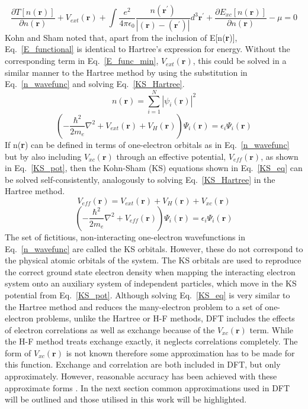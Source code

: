 \documentclass[11pt, twoside]{report}
\begin{document}
\begin{equation}\label{E_func_min}
\frac{\partial T[n(\mathbf{r})]}{\partial n(\mathbf{r})} + V_{ext}(\mathbf{r}) + \int \frac{e^2}{4\pi \epsilon_0}\frac{n(\mathbf{r^{\prime}})}{|(\mathbf{r})-(\mathbf{r^{\prime}})|}d^3\mathbf{r^{\prime}} + \frac{\partial E_{xc}[n(\mathbf{r})]}{\partial n(\mathbf{r})} - \mu = 0
\end{equation}
Kohn and Sham noted that, apart from the inclusion of E[n(\textbf{r})], Eq.~\ref{E_functional} is identical to Hartree's expression for energy. Without the corresponding term in Eq.~\ref{E_func_min}, $V_{ext}(\mathbf{r})$, this could be solved in a similar manner to the Hartree method by using the substitution in Eq.~\ref{n_wavefunc} and solving Eq.~\ref{KS_Hartree}.
\begin{equation}\label{n_wavefunc}
n(\mathbf{r}) = \sum^N_{i=1} |\psi_i(\mathbf{r})|^2
\end{equation}
\begin{equation}\label{KS_Hartree}
\left( -\frac{\hbar^2}{2m_e}\nabla^2 + V_{ext}(\mathbf{r}) + V_H(\mathbf{r}) \right) \Psi_i(\mathbf{r}) = \epsilon_i \Psi_i(\mathbf{r})  
\end{equation}
If n(\textbf{r}) can be defined in terms of one-electron orbitals as in Eq.~\ref{n_wavefunc} but by also including $V_{xc}(\mathbf{r})$ through an effective potential, $V_{eff}(\mathbf{r})$, as shown in Eq.~\ref{KS_pot}, then the Kohn-Sham (KS) equations shown in Eq.~\ref{KS_eq} can be solved self-consistently, analogously to solving Eq.~\ref{KS_Hartree} in the Hartree method.
\begin{equation}\label{KS_pot}
V_{eff}(\mathbf{r}) = V_{ext}(\mathbf{r}) + V_H(\mathbf{r}) + V_{xc}(\mathbf{r})
\end{equation}
\begin{equation}\label{KS_eq}
\left( -\frac{\hbar^2}{2m_e}\nabla^2 + V_{eff}(\mathbf{r}) \right) \Psi_i(\mathbf{r}) = \epsilon_i \Psi_i(\mathbf{r})
\end{equation}
The set of fictitious, non-interacting one-electron wavefunctions in Eq.~\ref{n_wavefunc} are called the KS orbitals. However, these do not correspond to the physical atomic orbitals of the system. The KS orbitals are used to reproduce the correct ground state electron density when mapping the interacting electron system onto an auxiliary system of independent particles, which move in the KS potential from Eq.~\ref{KS_pot}. Although solving Eq.~\ref{KS_eq} is very similar to the Hartree method and reduces the many-electron problem to a set of one-electron problems, unlike the Hartree or H-F methods, DFT includes the effects of electron correlations as well as exchange because of the $V_{xc}(\mathbf{r})$ term. While the H-F method treats exchange exactly, it neglects correlations completely. The form of $V_{xc}(\mathbf{r})$ is not known therefore some approximation has to be made for this function. Exchange and correlation are both included in DFT, but only approximately. However, reasonable accuracy has been achieved with these approximate forms \cite{Prasad_ch3}. In the next section common approximations used in DFT will be outlined and those utilised in this work will be highlighted.
\end{document}
